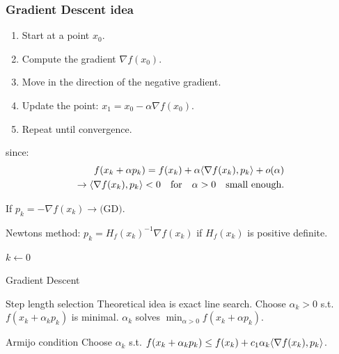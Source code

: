 \subsubsection*{Gradient Descent idea}
\begin{enumerate}
  \item Start at a point \( x_0 \).
  \item Compute the gradient \( \nabla f(x_0) \).
  \item Move in the direction of the negative gradient.
  \item Update the point: \( x_1 = x_0 - \alpha \nabla f(x_0) \).
  \item Repeat until convergence.
\end{enumerate}

since:
\begin{align*}
  f(x_k + \alpha p_k) = f(x_k) + \alpha \langle\nabla f(x_k), p_k\rangle + o(\alpha) \\
  \rightarrow \langle\nabla f(x_k), p_k\rangle < 0 \quad \text{for} \quad \alpha > 0 \quad \text{small enough}.
\end{align*}

\begin{example}{}{}
  If  \(p_k = - \nabla f(x_k) \rightarrow \text{(GD)}\).

  Newtons method:  \(p_k = H_f(x_k)^{-1} \nabla f(x_k)\) if  \(H_f(x_k)\) is positive definite.
\end{example}

\begin{algorithm}[H]
  \SetAlgoLined
  \(k \gets 0\)\;
  \;
  \caption{Gradient Descent}
\end{algorithm}

\begin{remark}{Step length selection}{}
  Theoretical idea is exact line search. Choose  \(\alpha_k > 0\) s.t.  \(f(x_k + \alpha_k p_k)\) is minimal.
  \(\alpha_k\) solves  \(\min_{\alpha > 0} f(x_k + \alpha p_k)\).
\end{remark}

\begin{definition}{Armijo condition}{}
  Choose  \(\alpha_k\) s.t.  \(f(x_k + \alpha_k p_k) \leq f(x_k) + c_1 \alpha_k \langle\nabla f(x_k), p_k\rangle\).
\end{definition}

